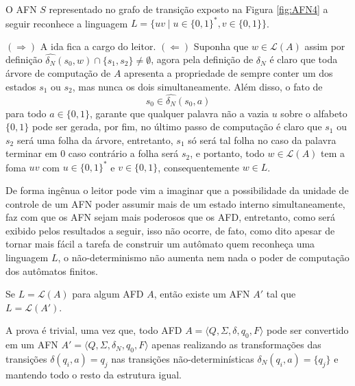 \begin{exemplo}\label{exe:LinguagemAFN2}
	O AFN $S$ representado no grafo de transição exposto na Figura \ref{fig:AFN4} a seguir reconhece a linguagem $L = \{uv \mid u \in \{0,1\}^*,  v \in \{0,1\}\}$.
\end{exemplo}

\begin{prova}
	$(\Rightarrow)$ A ida fica a cargo do leitor. $(\Leftarrow)$ Suponha que $w \in \mathcal{L}(A)$ assim por definição $\widehat{\delta_N}(s_0, w) \cap \{s_1, s_2\} \neq \emptyset$, agora pela definição de $\delta_N$ é claro que toda árvore de computação de $A$ apresenta a propriedade de sempre conter um dos estados $s_1$ ou $s_2$, mas nunca os dois simultaneamente. Além disso, o fato de
	$$s_0 \in \widehat{\delta_N}(s_0, a)$$
	para todo $a \in \{0,1\}$, garante que qualquer palavra não a vazia $u$ sobre o alfabeto $\{0,1\}$ pode ser gerada, por fim, no último passo de computação é claro que $s_1$ ou $s_2$ será uma folha da árvore, entretanto, $s_1$ só será tal folha no caso da palavra terminar em $0$ caso contrário a folha será $s_2$, e portanto, todo $w \in \mathcal{L}(A)$ tem a foma $uv$ com $u \in \{0, 1\}^*$ e $v \in \{0,1\}$, consequentemente $w \in L$.
\end{prova}

De forma ingênua o leitor pode vim a imaginar que a possibilidade da unidade de controle de um AFN poder assumir mais de um estado interno simultaneamente, faz com que os AFN sejam mais poderosos que os AFD, entretanto, como será exibido pelos resultados a seguir, isso não ocorre, de fato, como dito \cite{benjaLivro2010, linz2006} apesar de tornar mais fácil a tarefa de construir um autômato quem reconheça uma linguagem $L$, o não-determinismo não aumenta nem nada o poder de computação dos autômatos finitos.

\begin{teorema}\label{teo:AFD-Para-AFN}
	Se $L = \mathcal{L}(A)$ para algum AFD $A$, então existe um AFN $A'$ tal que $L = \mathcal{L}(A')$.
\end{teorema}

\begin{prova}
	A prova é trivial, uma vez que, todo AFD $A = \langle Q, \Sigma, \delta, q_0, F\rangle$ pode ser convertido em um AFN $A' = \langle Q, \Sigma, \delta_N, q_0, F\rangle$ apenas realizando as transformações das transições $\delta(q_i, a) = q_j$ nas transições não-determinísticas $\delta_N(q_i, a) = \{q_j\}$ e mantendo todo o resto da estrutura igual.
\end{prova}

